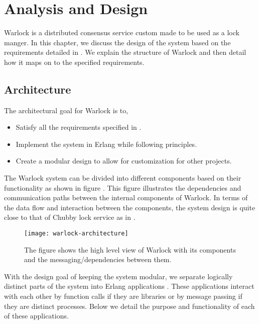 \chapter{Analysis and Design}
\label{chapter:analysis.design}

Warlock is a distributed consensus service custom made to be used as a
lock manger. In this chapter, we discuss the design of the system based on the
requirements detailed in . We explain the structure
of Warlock and then detail how it maps on to the specified requirements.

\section{Architecture}

The architectural goal for Warlock is to,

\begin{itemize}
  \item Satisfy all the requirements specified in .
  \item Implement the system in Erlang while following  principles.
  \item Create a modular design to allow for customization for other projects.
\end{itemize}

The Warlock system can be divided into different components based on their
functionality as shown in figure . This figure
illustrates the dependencies and communication paths between the internal
components of Warlock. In terms of the
data flow and interaction between the components, the system design is quite
close to that of Chubby lock service \citep{Burrows06} as in
.

\begin{figure}
  \begin{whole}
  \texttt{[image: warlock-architecture]}
  \caption[Warlock Architecture]{%
    The figure shows the high level view of Warlock with its components and the
    messaging/dependencies between them.}
    \label{figure:warlock.arch}
  \normalcaption
  \end{whole}
\end{figure}

With the design goal of keeping the system modular, we separate logically
distinct parts of the system into Erlang applications .
These applications interact with each other by function calls if they are
libraries or by message passing if they are distinct processes. Below we
detail the purpose and functionality of each of these applications.

